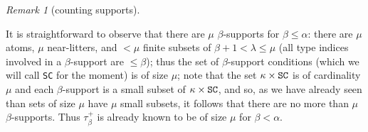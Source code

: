 \documentclass[112pt]{article}
\theoremstyle{definition}
\theoremstyle{remark}
\newtheorem{remark}[theorem]{Remark}
\begin{document}
\begin{remark}[counting supports]\label{rk:counting_supports}

It is straightforward to observe that there are $\mu$ $\beta$-supports for $\beta\leq \alpha$:  there are $\mu$ atoms, $\mu$ near-litters, and
$<\mu$ finite subsets of $\beta +1<\lambda \leq \mu$ (all type indices involved in a $\beta$-support are $\leq \beta$);  thus the set of $\beta$-support conditions (which we will call {\tt SC} for the moment) is of size $\mu$;
note that the set $\kappa \times {\tt SC}$ is of cardinality $\mu$ and each $\beta$-support is a small subset of  $\kappa \times {\tt SC}$, and so, as we have already seen than sets of size $\mu$ have $\mu$ small subsets, it follows that there are no more than $\mu$ $\beta$-supports.
Thus $\tau_\beta^+$ is already known to be of size $\mu$ for $\beta<\alpha$.

\end{remark}
\end{document}

